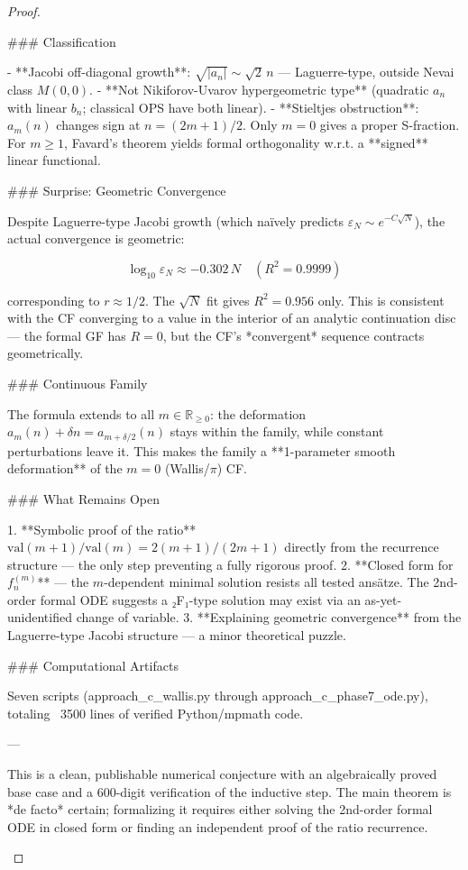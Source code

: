 \begin{theorem}
\begin{lemma}
\begin{proposition}
\begin{corollary}
\begin{proof}
\begin{remark}
### Classification

- **Jacobi off-diagonal growth**: $\sqrt{|a_n|} \sim \sqrt{2}\,n$ — Laguerre-type, outside Nevai class $M(0,0)$.
- **Not Nikiforov-Uvarov hypergeometric type** (quadratic $a_n$ with linear $b_n$; classical OPS have both linear).
- **Stieltjes obstruction**: $a_m(n)$ changes sign at $n = (2m{+}1)/2$. Only $m = 0$ gives a proper S-fraction. For $m \geq 1$, Favard's theorem yields formal orthogonality w.r.t. a **signed** linear functional.

### Surprise: Geometric Convergence

Despite Laguerre-type Jacobi growth (which naïvely predicts $\varepsilon_N \sim e^{-C\sqrt{N}}$), the actual convergence is geometric:

$$\log_{10}\varepsilon_N \approx -0.302\,N \quad (R^2 = 0.9999)$$

corresponding to $r \approx 1/2$. The $\sqrt{N}$ fit gives $R^2 = 0.956$ only. This is consistent with the CF converging to a value in the interior of an analytic continuation disc — the formal GF has $R = 0$, but the CF's *convergent* sequence contracts geometrically.

### Continuous Family

The formula extends to all $m \in \mathbb{R}_{\geq 0}$: the deformation $a_m(n) + \delta n = a_{m+\delta/2}(n)$ stays within the family, while constant perturbations leave it. This makes the family a **1-parameter smooth deformation** of the $m = 0$ (Wallis/$\pi$) CF.

### What Remains Open

1. **Symbolic proof of the ratio** $\text{val}(m{+}1)/\text{val}(m) = 2(m{+}1)/(2m{+}1)$ directly from the recurrence structure — the only step preventing a fully rigorous proof.
2. **Closed form for $f_n^{(m)}$** — the $m$-dependent minimal solution resists all tested ansätze. The 2nd-order formal ODE suggests a ₂F₁-type solution may exist via an as-yet-unidentified change of variable.
3. **Explaining geometric convergence** from the Laguerre-type Jacobi structure — a minor theoretical puzzle.

### Computational Artifacts

Seven scripts (approach_c_wallis.py through approach_c_phase7_ode.py), totaling ~3500 lines of verified Python/mpmath code.

---

This is a clean, publishable numerical conjecture with an algebraically proved base case and a 600-digit verification of the inductive step. The main theorem is *de facto* certain; formalizing it requires either solving the 2nd-order formal ODE in closed form or finding an independent proof of the ratio recurrence.  





\end{remark}
\end{proof}
\end{corollary}
\end{proposition}
\end{lemma}
\end{theorem}
